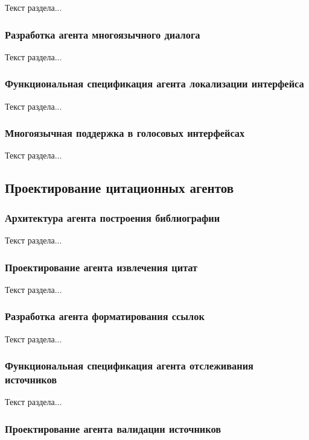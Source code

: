 Текст раздела...

\subsubsection{Разработка агента многоязычного диалога}

Текст раздела...

\subsubsection{Функциональная спецификация агента локализации интерфейса}

Текст раздела...

\subsubsection{Многоязычная поддержка в голосовых интерфейсах}

Текст раздела...

\subsection{Проектирование цитационных агентов}

\subsubsection{Архитектура агента построения библиографии}

Текст раздела...

\subsubsection{Проектирование агента извлечения цитат}

Текст раздела...

\subsubsection{Разработка агента форматирования ссылок}

Текст раздела...

\subsubsection{Функциональная спецификация агента отслеживания источников}

Текст раздела...

\subsubsection{Проектирование агента валидации источников}

